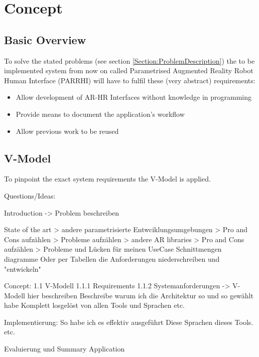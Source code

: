 \chapter{Concept}\label{Chap:Concept}

\section{Basic Overview}
To solve the stated problems (see section \ref{Section:ProblemDescription}) the to be implemented system from now on called Parametrised Augmented Reality Robot Human Interface (PARRHI) will have to fulfil these (very abstract) requirements:
\begin{itemize}
	\setlength\itemsep{-1em}
	\item Allow development of AR-HR Interfaces without knowledge in programming	
	\item Provide means to document the application's workflow
	\item Allow previous work to be reused
\end{itemize}



\section{V-Model}
To pinpoint the exact system requirements the V-Model is applied. 

Questions/Ideas:

Introduction -> Problem beschreiben 

State of the art
> andere parametrisierte Entwciklungsumgebungen
  > Pro and Cons aufzählen
  > Probleme aufzählen
> andere AR libraries
  > Pro and Cons aufzählen
  > Probleme und Lücken für meinen UseCase 
Schnittmengen diagramme
Oder per Tabellen die Anforderungen niederschreiben und "entwickeln"

Concept:
1.1 V-Modell
1.1.1 Requirements
1.1.2 Systemanforderungen
-> V-Modell hier beschreiben
Beschreibe warum ich die Architektur so und so gewählt habe
Komplett losgelöst von allen Tools und Sprachen etc.

Implementierung:
So habe ich es effektiv ausgeführt
Diese Sprachen dieses Tools. etc.

Evaluierung und Summary
Application 

